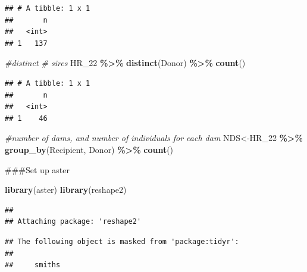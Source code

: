 \documentclass[
]{article}
\newenvironment{Shaded}{\begin{snugshade}}{\end{snugshade}}
\newcommand{\CommentTok}[1]{\textcolor[rgb]{0.56,0.35,0.01}{\textit{#1}}}
\newcommand{\FunctionTok}[1]{\textcolor[rgb]{0.13,0.29,0.53}{\textbf{#1}}}
\newcommand{\NormalTok}[1]{#1}
\newcommand{\OtherTok}[1]{\textcolor[rgb]{0.56,0.35,0.01}{#1}}
\newcommand{\SpecialCharTok}[1]{\textcolor[rgb]{0.81,0.36,0.00}{\textbf{#1}}}
\begin{document}
\begin{verbatim}
## # A tibble: 1 x 1
##       n
##   <int>
## 1   137
\end{verbatim}

\begin{Shaded}
\begin{Highlighting}[]
\CommentTok{\#distinct \# sires}
\NormalTok{HR\_22  }\SpecialCharTok{\%\textgreater{}\%}
  \FunctionTok{distinct}\NormalTok{(Donor) }\SpecialCharTok{\%\textgreater{}\%}
  \FunctionTok{count}\NormalTok{()}
\end{Highlighting}
\end{Shaded}

\begin{verbatim}
## # A tibble: 1 x 1
##       n
##   <int>
## 1    46
\end{verbatim}

\begin{Shaded}
\begin{Highlighting}[]
\CommentTok{\#number of dams, and number of individuals for each dam}
\NormalTok{NDS}\OtherTok{\textless{}{-}}\NormalTok{HR\_22 }\SpecialCharTok{\%\textgreater{}\%}
  \FunctionTok{group\_by}\NormalTok{(Recipient, Donor) }\SpecialCharTok{\%\textgreater{}\%} 
  \FunctionTok{count}\NormalTok{()}
\end{Highlighting}
\end{Shaded}

\#\#\#Set up aster

\begin{Shaded}
\begin{Highlighting}[]
\FunctionTok{library}\NormalTok{(aster)}
\FunctionTok{library}\NormalTok{(reshape2)}
\end{Highlighting}
\end{Shaded}

\begin{verbatim}
## 
## Attaching package: 'reshape2'
\end{verbatim}

\begin{verbatim}
## The following object is masked from 'package:tidyr':
## 
##     smiths
\end{verbatim}
\end{document}
